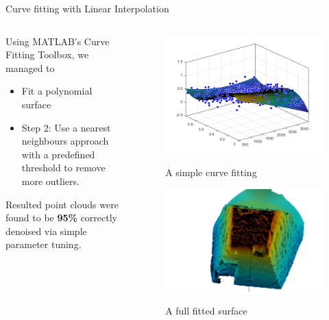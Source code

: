 \documentclass{beamer}
\begin{document}
\begin{frame}{Curve fitting with Linear Interpolation}

\begin{columns}
	\begin{column}{0.49\textwidth}
Using MATLAB's Curve Fitting Toolbox, we managed to 
\begin{itemize}
	\item Fit a polynomial surface
	\item Step 2: Use a nearest neighbours approach with a predefined threshold to remove more outliers. 
\end{itemize}

Resulted point clouds were found to be \textbf{95\%} correctly denoised via simple parameter tuning.
	\end{column}
	\begin{column}{0.6\textwidth}  %
		\begin{center}
			\begin{figure}
				\includegraphics[width=0.6\linewidth]{Figures/FitA}
				\label{fitA}
				\caption{A simple curve fitting}
			\end{figure}
			\begin{figure}
				\includegraphics[width=0.6\linewidth]{Figures/meshlab}
				\label{meshlab}
				\caption{A full fitted surface}
			\end{figure}
			
		\end{center}
	\end{column}
\end{columns}

\end{frame}
\end{document}
